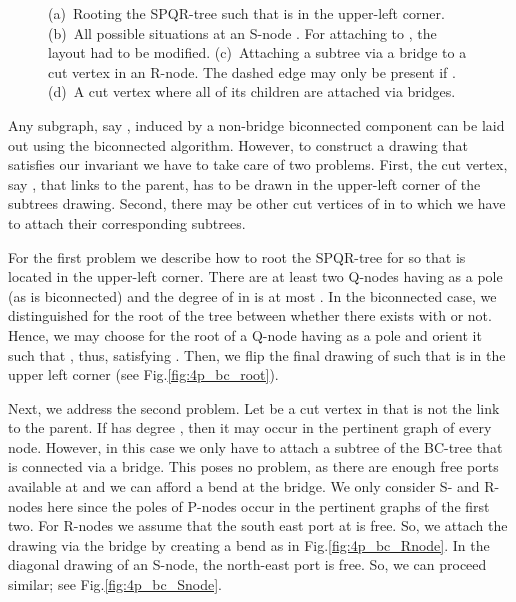 \documentclass[a4paper,twoside,11pt]{article}
\begin{document}
\begin{figure}[t]
    \centering
    \begin{minipage}[b]{.24\textwidth}
        \centering
        \subfloat[\label{fig:4p_bc_root}{}]
        {\texttt{[image: 4p\_bc]}}
    \end{minipage}
    \begin{minipage}[b]{.24\textwidth}
        \centering
        \subfloat[\label{fig:4p_bc_Snode}{}]
        {\texttt{[image: 4p\_bc]}}
    \end{minipage}
    \begin{minipage}[b]{.24\textwidth}
        \centering
        \subfloat[\label{fig:4p_bc_Rnode}{}]
        {\texttt{[image: 4p\_bc]}}
    \end{minipage}
    \begin{minipage}[b]{.24\textwidth}
        \centering
        \subfloat[\label{fig:4p_bc_bridges}{}]
        {\texttt{[image: 4p\_bc]}}
    \end{minipage}
    \caption{
    (a)~Rooting the SPQR-tree such that  is in the upper-left corner.
    (b)~All possible situations at an S-node . For attaching  to , the layout had to be modified.
    (c)~Attaching a subtree via a bridge to a cut vertex  in an R-node. The dashed edge  may only be present if .
    (d)~A cut vertex where all of its children are attached via bridges.}
\end{figure}

Any subgraph, say , induced by a non-bridge biconnected
component can be laid out using the biconnected algorithm. However,
to construct a drawing that satisfies our invariant we have to take
care of two problems. First, the cut vertex, say , that links
 to the parent, has to be drawn in the upper-left corner of the
subtrees drawing. Second, there may be other cut vertices of  in
 to which we have to attach their corresponding subtrees.

For the first problem we describe how to root the SPQR-tree
 for  so that  is located in the upper-left
corner. There are at least two Q-nodes having  as a pole (as
 is biconnected) and the degree of  in  is at most
. In the biconnected case, we distinguished for the root of the
tree between whether there exists  with  or
not. Hence, we may choose for the root of  a Q-node
having  as a pole and orient it such that , thus,
satisfying . Then, we flip the final drawing of
 such that  is in the upper left corner (see
Fig.\ref{fig:4p_bc_root}).

Next, we address the second problem. Let  be a cut vertex in
 that is not the link to the parent. If  has degree ,
then it may occur in the pertinent graph of every node. However, in
this case we only have to attach a subtree of the BC-tree that is
connected via a bridge. This poses no problem, as there are enough
free ports available at  and we can afford a bend at the
bridge. We only consider S- and R- nodes here since the poles of
P-nodes occur in the pertinent graphs of the first two. For R-nodes
we assume that the south east port at  is free. So, we attach
the drawing via the bridge by creating a bend as in
Fig.\ref{fig:4p_bc_Rnode}. In the diagonal drawing of an S-node, the
north-east port is free. So, we can proceed similar; see
Fig.\ref{fig:4p_bc_Snode}.
\end{document}
